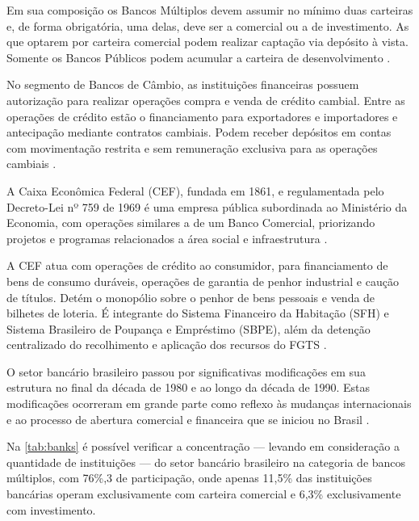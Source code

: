 \documentclass[12pt,openright,oneside,a4paper,chapter=TITLE,section=TITLE,subsection=TITLE,english,french,spanish,portugues,sumario=tradicional]{04-class-files/abntex2}
\begin{document}
Em sua composição os Bancos Múltiplos devem assumir no mínimo duas carteiras e,
de forma obrigatória, uma delas, deve ser a comercial ou a de investimento. As
que optarem por carteira comercial podem realizar captação via depósito à vista. Somente os Bancos Públicos podem acumular a carteira de desenvolvimento
\cite{Res:2099:1994}.

No segmento de Bancos de Câmbio, as instituições financeiras possuem
autorização para realizar operações compra e venda de crédito cambial. Entre as
operações de crédito estão o financiamento para exportadores e importadores e
antecipação mediante contratos cambiais. Podem receber depósitos em contas com
movimentação restrita e sem remuneração exclusiva para as operações cambiais
\cite{Res:3426:2006}.

A Caixa Econômica Federal (CEF), fundada em 1861, e regulamentada pelo
Decreto-Lei nº 759 de 1969 é uma empresa pública subordinada ao Ministério da
Economia, com operações similares a de um Banco Comercial, priorizando projetos
e programas relacionados a área social e infraestrutura \cite{DL:759:1969}.

A CEF atua com operações de crédito ao consumidor, para financiamento de bens
de consumo duráveis, operações de garantia de penhor industrial e caução de
títulos. Detém o monopólio sobre o penhor de bens pessoais e venda de bilhetes
de loteria. É integrante do Sistema Financeiro da Habitação (SFH) e Sistema
Brasileiro de Poupança e Empréstimo (SBPE), além da detenção centralizado do
recolhimento e aplicação dos recursos do FGTS \cite{DL:759:1969}.

O setor bancário brasileiro passou por significativas modificações em sua
estrutura no final da década de 1980 e ao longo da década de 1990. Estas
modificações ocorreram em grande parte como reflexo às mudanças internacionais
e ao processo de abertura comercial e financeira que se iniciou no Brasil
\cite{camargo:2009}.

Na \autoref{tab:banks} é possível verificar a concentração --- levando em
consideração a quantidade de instituições --- do setor bancário brasileiro na
categoria de bancos múltiplos, com 76\%,3 de participação, onde apenas 11,5\% das
instituições bancárias operam exclusivamente com carteira comercial e 6,3\%
exclusivamente com investimento.
\end{document}
